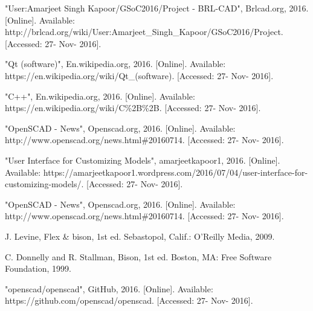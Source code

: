\documentclass[12pt]{report}
\begin{document}
 
\begin{thebibliography}{22}

\bibitem{} "User:Amarjeet Singh Kapoor/GSoC2016/Project - BRL-CAD", Brlcad.org, 2016. [Online]. Available: http://brlcad.org/wiki/User:Amarjeet\_Singh\_Kapoor/GSoC2016/Project. [Accessed: 27- Nov- 2016].

\bibitem{}"Qt (software)", En.wikipedia.org, 2016. [Online]. Available: https://en.wikipedia.org/wiki/Qt\_(software). [Accessed: 27- Nov- 2016].

\bibitem{} "C++", En.wikipedia.org, 2016. [Online]. Available: https://en.wikipedia.org/wiki/C\%2B\%2B. [Accessed: 27- Nov- 2016].

\bibitem{} "OpenSCAD - News", Openscad.org, 2016. [Online]. Available: http://www.openscad.org/news.html\#20160714. [Accessed: 27- Nov- 2016].

\bibitem{} "User Interface for Customizing Models", amarjeetkapoor1, 2016. [Online]. Available: https://amarjeetkapoor1.wordpress.com/2016/07/04/user-interface-for-customizing-models/. [Accessed: 27- Nov- 2016].

\bibitem{} "OpenSCAD - News", Openscad.org, 2016. [Online]. Available: http://www.openscad.org/news.html\#20160714. [Accessed: 27- Nov- 2016].

\bibitem{} J. Levine, Flex \& bison, 1st ed. Sebastopol, Calif.: O'Reilly Media, 2009.

\bibitem{} C. Donnelly and R. Stallman, Bison, 1st ed. Boston, MA: Free Software Foundation, 1999.

\bibitem{} "openscad/openscad", GitHub, 2016. [Online]. Available: https://github.com/openscad/openscad. [Accessed: 27- Nov- 2016].

\end{thebibliography}
\end{document}
